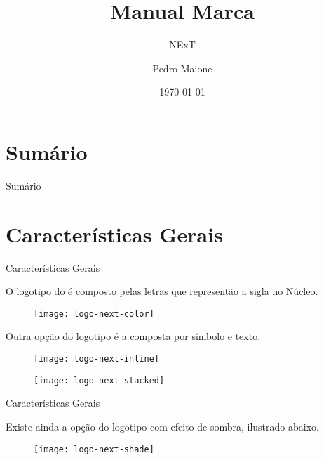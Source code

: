 \documentclass[10pt,aspectratio=43,xcolor,compress]{beamer}
\title{Manual Marca}
\subtitle{NExT}
\date{\today}
\author{Pedro Maione}
\institute{\NExT}
\begin{document}

\maketitle

\section*{Sumário}
\begin{frame}{Sumário}
  \tableofcontents[hideallsubsections]
\end{frame}

\section{Características Gerais}

\begin{frame}{Características Gerais}

O logotipo do \NExT{}  é composto pelas letras que representão a sigla no Núcleo.

\begin{figure}[!htp]
  \centering
  \texttt{[image: logo-next-color]}
\end{figure}

Outra opção do logotipo é a composta por símbolo e texto.

\begin{figure}[!htp]
  \centering
  \texttt{[image: logo-next-inline]}
\end{figure}

\begin{figure}[!htp]
  \centering
  \texttt{[image: logo-next-stacked]}
\end{figure}


\end{frame}

\begin{frame}{Características Gerais}

Existe ainda a opção do logotipo com efeito de sombra, ilustrado abaixo.

\begin{figure}[!htp]
  \centering
  \texttt{[image: logo-next-shade]}
\end{figure}

\end{frame}
\end{document}
